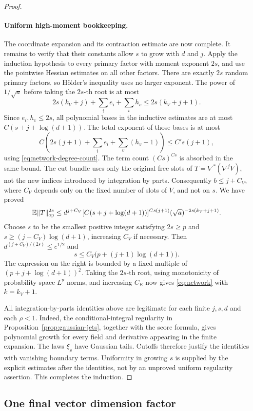 \begin{proof}
\paragraph{Uniform high-moment bookkeeping.}
The coordinate expansion and its contraction estimate are now complete.
It remains to verify that their constants allow $s$ to grow with $d$
and $j$.  Apply the induction hypothesis to every primary factor with
moment exponent $2s$, and use the pointwise Hessian estimates on all
other factors.  There are exactly $2s$ random primary factors, so H\"older's
inequality uses no larger exponent.  The power of $1/\sqrt a$ before
taking the $2s$-th root is at most
\[
 2s(k_V+j)+\sum_i e_i+\sum_v h_v
 \le 2s(k_V+j+1).
\]
Since $e_i,h_v\le2s$, all polynomial bases in the inductive estimates
are at most $C(s+j+\log(d+1))$.  The total exponent of those bases is
at most
\[
 C\left(2s(j+1)+\sum_i e_i+\sum_v(h_v+1)\right)
 \le C's(j+1),
\]
using \eqref{eq:network-degree-count}.  The term count $(Cs)^{Cs}$
is absorbed in the same bound.  The cut bundle uses only the original free slots of
$T=\nabla^*(\nabla^jV)$, not the new indices introduced by
integration by parts.  Consequently $b\le j+C_V$, where $C_V$
depends only on the fixed number of slots of $V$, and not on $s$.  We have proved
\[
 \mathbb E\|T\|_{\mathrm{op}}^{2s}
 \le d^{j+C_V}
       [C(s+j+\log(d+1))]^{Cs(j+1)}
       (\sqrt a)^{-2s(k_V+j+1)}.
\]
Choose $s$ to be the smallest positive integer satisfying $2s\ge p$
and $s\ge(j+C_V)\log(d+1)$, increasing $C_V$ if necessary.
Then $d^{(j+C_V)/(2s)}\le e^{1/2}$ and
\[
 s\le C_V\bigl(p+(j+1)\log(d+1)\bigr).
\]
The expression on the right is bounded by a fixed multiple of
$(p+j+\log(d+1))^2$.  Taking the $2s$-th root, using monotonicity
of probability-space $L^p$ norms, and increasing $C_E$ now gives
\eqref{eq:network} with $k=k_V+1$.

All integration-by-parts identities above are legitimate for each
finite $j,s,d$ and each $\rho<1$.  Indeed, the conditional-integral
regularity in Proposition~\ref{prop:gaussian-jets}, together with
the score formula, gives polynomial growth for every field and
derivative appearing in the finite expansion.  The laws $\xi_\rho$
have Gaussian tails.  Cutoffs therefore justify the identities with
vanishing boundary terms.  Uniformity in growing $s$ is supplied by
the explicit estimates after the identities, not by an unproved
uniform regularity assertion.  This completes the induction.
\end{proof}

\subsection{One final vector dimension factor}

